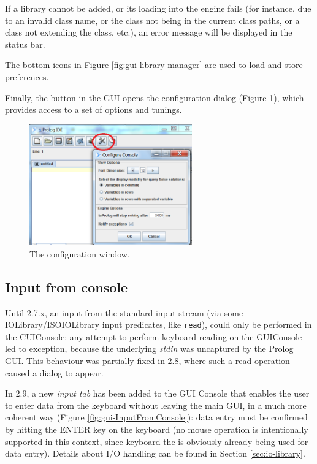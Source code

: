 If a library cannot be added, or its loading into the engine fails (for instance, due to an invalid class name, or the class not being in the current class paths, or a class not extending the  class, etc.), an error message will be displayed in the status bar.

The bottom icons in Figure \ref{fig:gui-library-manager} are used to load and store preferences.

\noindent Finally, the  button in the \tuprolog{} GUI opens the configuration dialog (Figure \ref{fig:gui-configuration}), which provides access to a set of options and tunings.

\begin{figure}
\centering
\includegraphics[width=7cm]{images/gui-config}
\caption{The configuration window.}
\label{fig:gui-configuration}
\end{figure}

\subsection{Input from console}
\label{ssec:input-from-console}

Until \tuprolog{} 2.7.x, an input from the standard input stream (via some IOLibrary/ISOIOLibrary input predicates, like \texttt{read}), could only be performed in the CUIConsole: any attempt to perform keyboard reading on the GUIConsole led to exception, because the underlying \emph{stdin} was uncaptured by the Prolog GUI.
This behaviour was partially fixed in \tuprolog{} 2.8, where such a read operation caused a dialog to appear.

In \tuprolog{} 2.9, a new \textit{input tab} has been added to the GUI Console that enables the user to enter data from the keyboard without leaving the main GUI, in a much more coherent way (Figure \ref{fig:gui-InputFromConsole}): data entry must be confirmed by hitting the ENTER key on the keyboard (no mouse operation is intentionally supported in this context, since keyboard the is obviously already being used for data entry). Details about I/O handling can be found in Section \ref{sec:io-library}.

